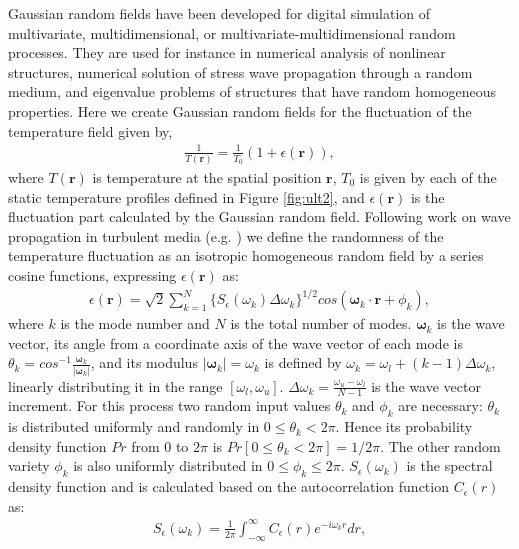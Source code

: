                 Gaussian random fields have been developed for digital simulation of multivariate, multidimensional, or multivariate-multidimensional random
processes. They are used for instance in numerical analysis of nonlinear structures, numerical solution of stress wave propagation through a random medium, and
eigenvalue problems of structures that have random homogeneous properties. Here we create Gaussian random fields for the fluctuation of the temperature field
given by,
                \begin{align}\label{eq:3_4}
                    \frac{1}{T(\bm{r})}=\frac{1}{T_0}(1+\epsilon(\bm{r})),
                \end{align}
                where $T(\bm{r})$ is temperature at the spatial position $\bm{r}$, $T_0$ is given by each of the static temperature profiles defined in Figure
\ref{fig:ult2}, and $\epsilon(\bm{r})$ is the fluctuation part calculated by the Gaussian random field.
                Following work on wave propagation in turbulent media (e.g. \textcite{Lue2012Stochasticsimulationof}) we define the randomness of the
temperature fluctuation as an isotropic homogeneous random field by a series cosine functions, expressing $\epsilon(\bm{r})$ as:
                \begin{align}\label{eq:3_5}
                    \epsilon(\bm{r})=\sqrt{2}\sum_{k=1}^N \{S_{\epsilon}(\omega_k)\Delta \omega_k\}^{1/2}cos(\bm{\omega}_k \cdot \bm{r}+\phi_k),
                \end{align}
                where $k$ is the mode number and $N$ is the total number of modes. $\bm{\omega}_k$ is the wave vector, its angle from a coordinate axis of the
wave vector of each mode is $\theta_k = cos^{-1} \frac{\bm{\omega}_k}{|\bm{\omega}_k|}$, and its modulus $|\bm{\omega}_k|=\omega_k$ is defined by
$\omega_k=\omega_l + (k-1)\Delta \omega_k$, linearly distributing it in the range $[\omega_l,\omega_u]$. $\Delta \omega_k = \frac{\omega_u-\omega_l}{N-1}$ is
the wave vector increment. For this process two random input values $\theta_k$ and $\phi_k$ are necessary: $\theta_k$ is distributed uniformly and randomly in
$0\leq\theta_k<2\pi$. Hence its probability density function $Pr$ from 0 to $2\pi$ is $Pr[0\leq\theta_k<2\pi]=1/2\pi$. The other random variety $\phi_k$ is
also uniformly distributed in $0\leq\phi_k\leq 2\pi$. $S_{\epsilon}(\omega_k)$ is the spectral density function and is calculated based on the autocorrelation
function $C_{\epsilon}(r)$ as:
                \begin{align}\label{eq:3_6}
                    S_{\epsilon}(\omega_k)=\frac{1}{2\pi}\int_{-\infty}^\infty C_{\epsilon}(r)e^{-i\omega_kr}dr,
                \end{align}

